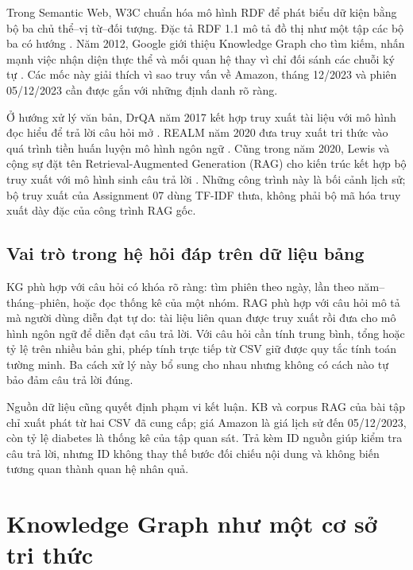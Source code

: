 \documentclass[12pt,a4paper]{report}
\begin{document}
Trong Semantic Web, W3C chuẩn hóa mô hình RDF để phát biểu dữ kiện bằng bộ ba
chủ thể--vị từ--đối tượng. Đặc tả RDF 1.1 mô tả đồ thị như một tập các bộ ba có hướng
\cite{w3c_rdf}. Năm 2012, Google giới thiệu Knowledge Graph cho tìm kiếm, nhấn mạnh
việc nhận diện thực thể và mối quan hệ thay vì chỉ đối sánh các chuỗi ký tự
\cite{google_kg}. Các mốc này giải thích vì sao truy vấn về Amazon, tháng 12/2023 và
phiên 05/12/2023 cần được gắn với những định danh rõ ràng.

Ở hướng xử lý văn bản, DrQA năm 2017 kết hợp truy xuất tài liệu với mô hình đọc hiểu
để trả lời câu hỏi mở \cite{drqa}. REALM năm 2020 đưa truy xuất tri thức vào quá trình
tiền huấn luyện mô hình ngôn ngữ \cite{realm}. Cũng trong năm 2020, Lewis và cộng sự
đặt tên Retrieval-Augmented Generation (RAG) cho kiến trúc kết hợp bộ truy xuất với
mô hình sinh câu trả lời \cite{lewis_rag}. Những công trình này là bối cảnh lịch sử; bộ
truy xuất của Assignment 07 dùng TF-IDF thưa, không phải bộ mã hóa truy xuất dày đặc
của công trình RAG gốc.

\subsection{Vai trò trong hệ hỏi đáp trên dữ liệu bảng}
KG phù hợp với câu hỏi có khóa rõ ràng: tìm phiên theo ngày, lần theo năm--tháng--phiên,
hoặc đọc thống kê của một nhóm. RAG phù hợp với câu hỏi mô tả mà người dùng diễn đạt
tự do: tài liệu liên quan được truy xuất rồi đưa cho mô hình ngôn ngữ để diễn đạt câu trả
lời. Với câu hỏi cần tính trung bình, tổng hoặc tỷ lệ trên nhiều bản ghi, phép tính trực
tiếp từ CSV giữ được quy tắc tính toán tường minh. Ba cách xử lý này bổ sung cho nhau
nhưng không có cách nào tự bảo đảm câu trả lời đúng.

Nguồn dữ liệu cũng quyết định phạm vi kết luận. KB và corpus RAG của bài tập chỉ xuất
phát từ hai CSV đã cung cấp; giá Amazon là giá lịch sử đến 05/12/2023, còn tỷ lệ
diabetes là thống kê của tập quan sát. Trả kèm ID nguồn giúp kiểm tra câu trả lời, nhưng
ID không thay thế bước đối chiếu nội dung và không biến tương quan thành quan hệ nhân quả.

\section{Knowledge Graph như một cơ sở tri thức}
\end{document}
